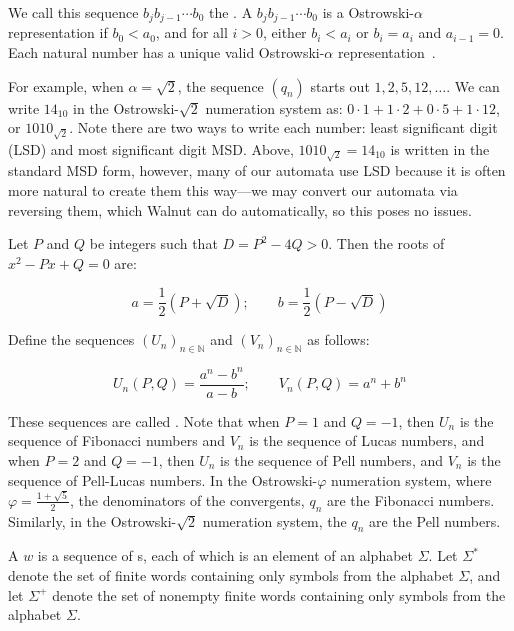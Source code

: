 We call this sequence $b_j b_{j-1} \cdots b_0$ the .
A \word $b_j b_{j-1} \cdots b_0$ is a  Ostrowski-$\alpha$ representation if $b_0 < a_0$, and for all $i > 0$, either $b_i < a_i$ or $b_i = a_i$ and $a_{i-1} = 0$.
Each natural number has a unique valid Ostrowski-$\alpha$ representation~\cite{Ostrowski1922}.

For example, when $\alpha = \sqrt{2}$, the sequence $(q_n)$ starts out $1,2,5,12,\ldots$.
We can write $14_{10}$ in the Ostrowski-$\sqrt{2}$ numeration system as: $0\cdot1 + 1\cdot2 + 0\cdot5 + 1\cdot12$, or $1010_{\sqrt{2}}$.
Note there are two ways to write each number: least significant digit (LSD) and most significant digit MSD.
Above, $1010_{\sqrt{2}} = 14_{10}$ is written in the standard MSD form, however, many of our automata use LSD because it is often more natural to create them this way---we may convert our automata via reversing them, which Walnut can do automatically, so this poses no issues.

Let $P$ and $Q$ be integers such that $D = P^2 - 4Q > 0$.
Then the roots of $x^2 - Px + Q = 0$ are:

\begin{equation*}
    a = \frac{1}{2} \left( P + \sqrt{D} \right); \quad \quad 
    b = \frac{1}{2} \left( P - \sqrt{D} \right)
\end{equation*}

Define the sequences $(U_n)_{n \in \mathbb{N}}$ and $(V_n)_{n \in \mathbb{N}}$ as follows:

\begin{equation*}
    U_n(P, Q) = \frac{a^n - b^n}{a - b}; \quad \quad V_n(P, Q) = a^n + b^n
\end{equation*}

These sequences are called .
Note that when $P = 1$ and $Q = -1$, then $U_n$ is the sequence of Fibonacci numbers and $V_n$ is the sequence of Lucas numbers, and when $P = 2$ and $Q = -1$, then $U_n$ is the sequence of Pell numbers, and $V_n$ is the sequence of Pell-Lucas numbers.
In the Ostrowski-$\varphi$ numeration system, where $\varphi = \frac{1 + \sqrt{5}}{2}$, the denominators of the convergents, $q_n$ are the Fibonacci numbers.
Similarly, in the Ostrowski-$\sqrt{2}$ numeration system, the $q_n$ are the Pell numbers.

A \term{\word} $w$ is a sequence of s, each of which is an element of an alphabet $\Sigma$.
Let $\Sigma^*$ denote the set of finite words containing only symbols from the alphabet $\Sigma$, and let $\Sigma^+$ denote the set of nonempty finite words containing only symbols from the alphabet $\Sigma$.

